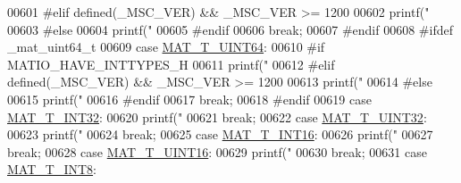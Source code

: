 \begin{DoxyCode}
{{{{{{{{{{{{{{{{{{{{{{{{{{00601 \textcolor{preprocessor}{#elif defined(\_MSC\_VER) && \_MSC\_VER >= 1200}
00602             printf(\textcolor{stringliteral}{"%
00603 \textcolor{preprocessor}{#else}
00604             printf(\textcolor{stringliteral}{"%
00605 \textcolor{preprocessor}{#endif}
00606             \textcolor{keywordflow}{break};
00607 \textcolor{preprocessor}{#endif}
00608 \textcolor{preprocessor}{#ifdef \_mat\_uint64\_t}
00609         \textcolor{keywordflow}{case} \hyperlink{group___m_a_t_ggacf7b3b879282b7ab3a51190e49bf3453a45547932c46be27118abe08302d7e29f}{MAT\_T\_UINT64}:
00610 \textcolor{preprocessor}{#if MATIO\_HAVE\_INTTYPES\_H}
00611             printf(\textcolor{stringliteral}{"%
00612 \textcolor{preprocessor}{#elif defined(\_MSC\_VER) && \_MSC\_VER >= 1200}
00613             printf(\textcolor{stringliteral}{"%
00614 \textcolor{preprocessor}{#else}
00615             printf(\textcolor{stringliteral}{"%
00616 \textcolor{preprocessor}{#endif}
00617             \textcolor{keywordflow}{break};
00618 \textcolor{preprocessor}{#endif}
00619         \textcolor{keywordflow}{case} \hyperlink{group___m_a_t_ggacf7b3b879282b7ab3a51190e49bf3453a83e06a68320726c6572bfbb9f3addb1d}{MAT\_T\_INT32}:
00620             printf(\textcolor{stringliteral}{"%
00621             \textcolor{keywordflow}{break};
00622         \textcolor{keywordflow}{case} \hyperlink{group___m_a_t_ggacf7b3b879282b7ab3a51190e49bf3453aa397e285a23fe240368b752897652c6a}{MAT\_T\_UINT32}:
00623             printf(\textcolor{stringliteral}{"%
00624             \textcolor{keywordflow}{break};
00625         \textcolor{keywordflow}{case} \hyperlink{group___m_a_t_ggacf7b3b879282b7ab3a51190e49bf3453a8c5b2e381946e95ea8d81ac216743302}{MAT\_T\_INT16}:
00626             printf(\textcolor{stringliteral}{"%
00627             \textcolor{keywordflow}{break};
00628         \textcolor{keywordflow}{case} \hyperlink{group___m_a_t_ggacf7b3b879282b7ab3a51190e49bf3453a05bc7af7680aa68be95126ae0a4c2e31}{MAT\_T\_UINT16}:
00629             printf(\textcolor{stringliteral}{"%
00630             \textcolor{keywordflow}{break};
00631         \textcolor{keywordflow}{case} \hyperlink{group___m_a_t_ggacf7b3b879282b7ab3a51190e49bf3453a9807f5033ed4f9b548953742d9fd1658}{MAT\_T\_INT8}:
}}}}}}}}}}}}}}}}}}}}}}}}}}}}}}}}}}}
\end{DoxyCode}
